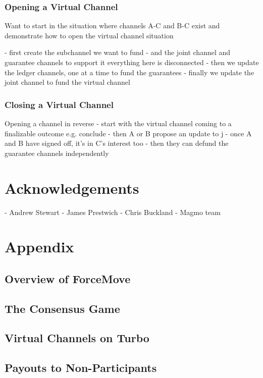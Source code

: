 \documentclass{article}
\begin{document}
\subsubsection{Opening a Virtual Channel}

Want to start in the situation where channels A-C and B-C exist and demonstrate how to
open the virtual channel situation

- first create the subchannel we want to fund
- and the joint channel and guarantee channels to support it
everything here is disconnected
- then we update the ledger channels, one at a time to fund the guarantees
- finally we update the joint channel to fund the virtual channel

\subsubsection{Closing a Virtual Channel}

Opening a channel in reverse
- start with the virtual channel coming to a finalizable outcome e.g. conclude
- then A or B propose an update to j
- once A and B have signed off, it's in C's interest too
- then they can defund the guarantee channels independently


\section{Acknowledgements}

- Andrew Stewart
- James Prestwich
- Chris Buckland
- Magmo team


\section{Appendix}

\subsection{Overview of ForceMove}
\subsection{The Consensus Game}
\subsection{Virtual Channels on Turbo}
\subsection{Payouts to Non-Participants}
\end{document}
